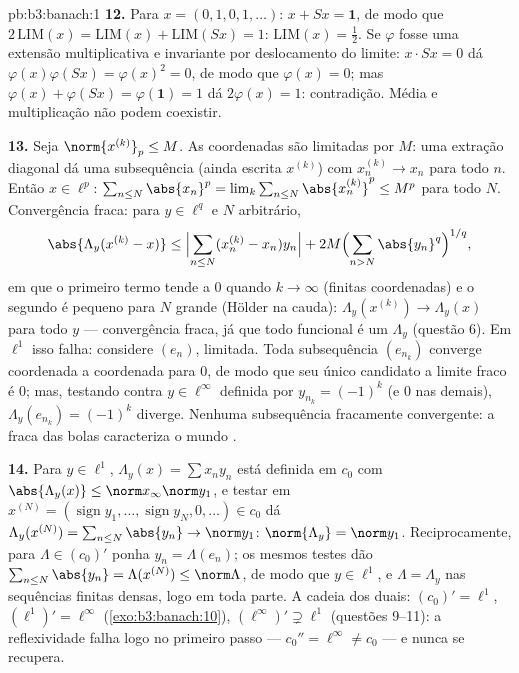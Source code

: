 \begin{solution}{pb:b3:banach:1}
\textbf{12.} Para $x = (0,1,0,1,\dots)$: $x + Sx = \mathbf 1$,
de modo que $2\,\mathrm{LIM}(x) = \mathrm{LIM}(x) + \mathrm{LIM}(Sx) =
1$: $\mathrm{LIM}(x) = \frac12$. Se $\varphi$ fosse uma
extensão multiplicativa e invariante por deslocamento do limite: $x\cdot
Sx = 0$ dá $\varphi(x)\varphi(Sx) = \varphi(x)^2 = 0$, de modo que
$\varphi(x) = 0$; mas $\varphi(x) + \varphi(Sx) =
\varphi(\mathbf 1) = 1$ dá $2\varphi(x) = 1$: contradição.
Média e multiplicação não podem coexistir.

\textbf{13.} Seja $\norm{x^{(k)}}_p \leq M$. As coordenadas são
limitadas por $M$: uma extração diagonal dá uma subsequência
(ainda escrita $x^{(k)}$) com $x^{(k)}_n \to x_n$ para todo
$n$. Então $x \in \ell^p$: $\sum_{n\leq N}\abs{x_n}^p =
\lim_k\sum_{n\leq N}\abs{x^{(k)}_n}^p \leq M^p$ para todo $N$.
Convergência fraca: para $y \in \ell^q$ e $N$ arbitrário,
\[
\abs{\Lambda_y(x^{(k)} - x)} \leq
\Bigl|\sum_{n \leq N}(x^{(k)}_n - x_n)y_n\Bigr|
+ 2M\Bigl(\sum_{n>N}\abs{y_n}^q\Bigr)^{1/q},
\]
em que o primeiro termo tende a $0$ quando $k \to \infty$ (finitas
coordenadas) e o segundo é pequeno para $N$ grande
(Hölder na cauda): $\Lambda_y(x^{(k)}) \to \Lambda_y(x)$
para todo $y$ --- convergência fraca, já que todo funcional é um
$\Lambda_y$ (questão 6). Em $\ell^1$ isso falha: considere
$(e_n)$, limitada. Toda subsequência $(e_{n_k})$ converge
coordenada a coordenada para $0$, de modo que seu único candidato a limite fraco é $0$;
mas, testando contra $y \in \ell^\infty$ definida por $y_{n_k} =
(-1)^k$ (e $0$ nas demais), $\Lambda_y(e_{n_k}) = (-1)^k$
diverge. Nenhuma subsequência fracamente convergente: a  fraca das bolas caracteriza o mundo .

\textbf{14.} Para $y \in \ell^1$, $\Lambda_y(x) = \sum x_ny_n$
está definida em $c_0$ com $\abs{\Lambda_y(x)} \leq \norm
x_\infty\norm y_1$, e testar em $x^{(N)} =
(\operatorname{sign}y_1, \dots, \operatorname{sign}y_N, 0,
\dots) \in c_0$ dá $\Lambda_y(x^{(N)}) =
\sum_{n\leq N}\abs{y_n} \to \norm y_1$:
$\norm{\Lambda_y} = \norm y_1$. Reciprocamente, para $\Lambda \in
(c_0)'$ ponha $y_n = \Lambda(e_n)$; os mesmos testes dão
$\sum_{n \leq N}\abs{y_n} = \Lambda(x^{(N)}) \leq
\norm\Lambda$, de modo que $y \in \ell^1$, e $\Lambda = \Lambda_y$ nas
sequências finitas densas, logo em toda parte. A cadeia dos
duais: $(c_0)' = \ell^1$, $(\ell^1)' = \ell^\infty$
(\cref{exo:b3:banach:10}), $(\ell^\infty)' \supsetneq \ell^1$
(questões 9--11): a reflexividade falha logo no primeiro passo
--- $c_0'' = \ell^\infty \neq c_0$ --- e nunca se recupera.


\end{solution}
